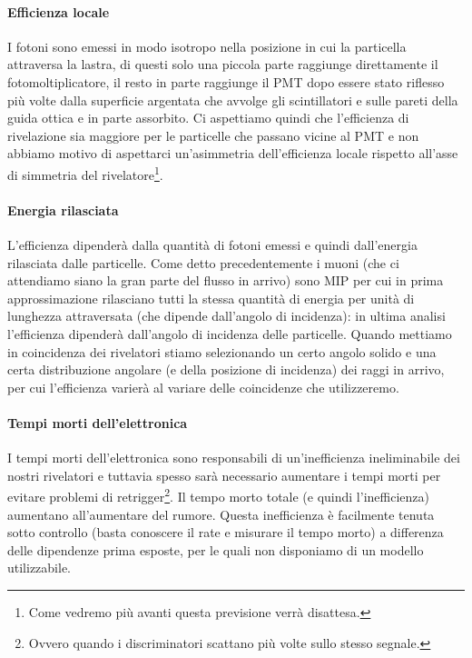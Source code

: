 \paragraph{Efficienza locale}
I fotoni sono emessi in modo isotropo nella posizione in cui la particella attraversa la lastra,
di questi solo una piccola parte raggiunge direttamente il fotomoltiplicatore, il resto in parte raggiunge il PMT dopo essere stato riflesso più volte dalla superficie argentata che avvolge gli scintillatori e sulle pareti della guida ottica e in parte assorbito. Ci aspettiamo quindi che l'efficienza di rivelazione sia maggiore per le particelle che passano vicine al PMT e non abbiamo motivo di aspettarci un'asimmetria dell'efficienza locale rispetto all'asse di simmetria del rivelatore\footnote{Come vedremo più avanti questa previsione verrà disattesa.}.

\paragraph{Energia rilasciata}
L'efficienza dipenderà dalla quantità di fotoni emessi e quindi dall'energia rilasciata dalle particelle. Come detto precedentemente i muoni (che ci attendiamo siano la gran parte del flusso in arrivo) sono MIP per cui in prima approssimazione rilasciano tutti la stessa quantità di energia per unità di lunghezza attraversata (che dipende dall'angolo di incidenza): in ultima analisi l'efficienza dipenderà dall'angolo di incidenza delle particelle.
Quando mettiamo in coincidenza dei rivelatori stiamo selezionando un certo angolo solido e una certa distribuzione angolare (e della posizione di incidenza) dei raggi in arrivo, per cui l'efficienza varierà al variare delle coincidenze che utilizzeremo.

\paragraph{Tempi morti dell'elettronica}
I tempi morti dell'elettronica sono responsabili di un'inefficienza ineliminabile dei nostri rivelatori e tuttavia spesso sarà necessario aumentare i tempi morti per evitare problemi di retrigger\footnote{Ovvero quando i discriminatori scattano più volte sullo stesso segnale.}. Il tempo morto totale (e quindi l'inefficienza) aumentano all'aumentare del rumore. Questa inefficienza è facilmente tenuta sotto controllo (basta conoscere il rate e misurare il tempo morto) a differenza delle dipendenze prima esposte, per le quali non disponiamo di un modello utilizzabile.

